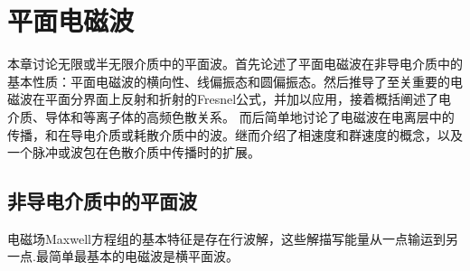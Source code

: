 \chapter{平面电磁波}
\label{chap:plane wave}

本章讨论无限或半无限介质中的平面波。首先论述了平面电磁波在非导电介质中的基本性质：平面电磁波的横向性、线偏振态和圆偏振态。然后推导了至关重要的电磁波在平面分界面上反射和折射的Fresnel公式，并加以应用，接着概括阐述了电介质、导体和等离子体的高频色散关系。%
而后简单地讨论了电磁波在电离层中的传播，和在导电介质或耗散介质中的波。继而介绍了相速度和群速度的概念，以及一个脉冲或波包在色散介质中传播时的扩展。%

\section{非导电介质中的平面波}

电磁场Maxwell方程组的基本特征是存在行波解，这些解描写能量从一点输运到另一点.最简单最基本的电磁波是横平面波。%


